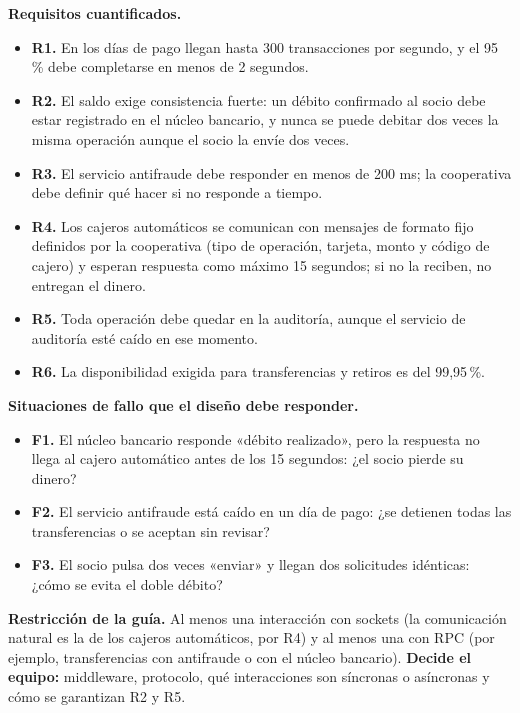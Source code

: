 \documentclass[10pt]{article}
\begin{document}
\textbf{Requisitos cuantificados.}
\begin{itemize}[leftmargin=1.6em]
	\item \textbf{R1.} En los días de pago llegan hasta 300 transacciones por segundo, y el 95\,\% debe completarse en menos de 2 segundos.
	\item \textbf{R2.} El saldo exige consistencia fuerte: un débito confirmado al socio debe estar registrado en el núcleo bancario, y nunca se puede debitar dos veces la misma operación aunque el socio la envíe dos veces.
	\item \textbf{R3.} El servicio antifraude debe responder en menos de 200 ms; la cooperativa debe definir qué hacer si no responde a tiempo.
	\item \textbf{R4.} Los cajeros automáticos se comunican con mensajes de formato fijo definidos por la cooperativa (tipo de operación, tarjeta, monto y código de cajero) y esperan respuesta como máximo 15 segundos; si no la reciben, no entregan el dinero.
	\item \textbf{R5.} Toda operación debe quedar en la auditoría, aunque el servicio de auditoría esté caído en ese momento.
	\item \textbf{R6.} La disponibilidad exigida para transferencias y retiros es del 99,95\,\%.
\end{itemize}

\textbf{Situaciones de fallo que el diseño debe responder.}
\begin{itemize}[leftmargin=1.6em]
	\item \textbf{F1.} El núcleo bancario responde «débito realizado», pero la respuesta no llega al cajero automático antes de los 15 segundos: ¿el socio pierde su dinero?
	\item \textbf{F2.} El servicio antifraude está caído en un día de pago: ¿se detienen todas las transferencias o se aceptan sin revisar?
	\item \textbf{F3.} El socio pulsa dos veces «enviar» y llegan dos solicitudes idénticas: ¿cómo se evita el doble débito?
\end{itemize}

\textbf{Restricción de la guía.} Al menos una interacción con sockets (la comunicación natural es la de los cajeros automáticos, por R4) y al menos una con RPC (por ejemplo, transferencias con antifraude o con el núcleo bancario). \textbf{Decide el equipo:} middleware, protocolo, qué interacciones son síncronas o asíncronas y cómo se garantizan R2 y R5.
\end{document}
